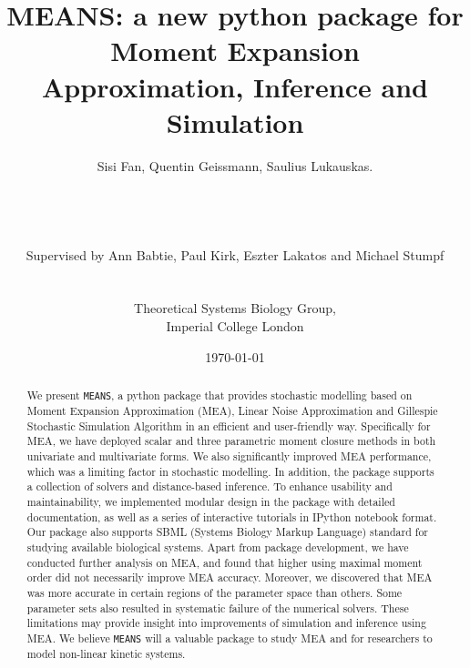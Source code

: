 \documentclass[11pt,a4paper]{article}
\newcommand{\means}{\texttt{MEANS}}
\begin{document}
\listoftodos
\newpage

\title{MEANS: a new python package for Moment Expansion Approximation, Inference and Simulation}
\author{Sisi Fan, Quentin Geissmann, Saulius Lukauskas.\\
\\	
\\
\\
\\
Supervised by Ann Babtie, Paul Kirk, Eszter Lakatos and Michael Stumpf\\
\\
\\
Theoretical Systems Biology Group,\\
Imperial College London
}
\date{\today}

\clearpage\maketitle
\thispagestyle{empty}
\newpage{}


\begin{abstract}
We present \means, a python package that provides stochastic modelling based on Moment Expansion Approximation (MEA),
Linear Noise Approximation and Gillespie Stochastic Simulation Algorithm in an efficient and user-friendly way.
Specifically for MEA, we have deployed scalar and three parametric moment closure methods in both univariate and multivariate forms.
We also significantly improved MEA performance, which was a limiting factor in stochastic modelling.
In addition, the package supports a collection of solvers and distance-based inference.
To enhance usability and maintainability, we implemented modular design in the package with detailed documentation,
as well as a series of interactive tutorials in IPython notebook format.
Our package also supports SBML (Systems Biology Markup Language) standard for studying available biological systems.
Apart from package development, we have conducted further analysis on MEA, and
found that higher using maximal moment order did not necessarily improve MEA accuracy.
Moreover, we discovered that MEA was more accurate in certain regions of the parameter space than others.
Some parameter sets also resulted in systematic failure of the numerical solvers.
These limitations may provide insight into improvements of simulation and inference using MEA.
We believe \means{} will a valuable package to study MEA and for researchers to model non-linear kinetic systems.
\end{abstract}
\end{document}
